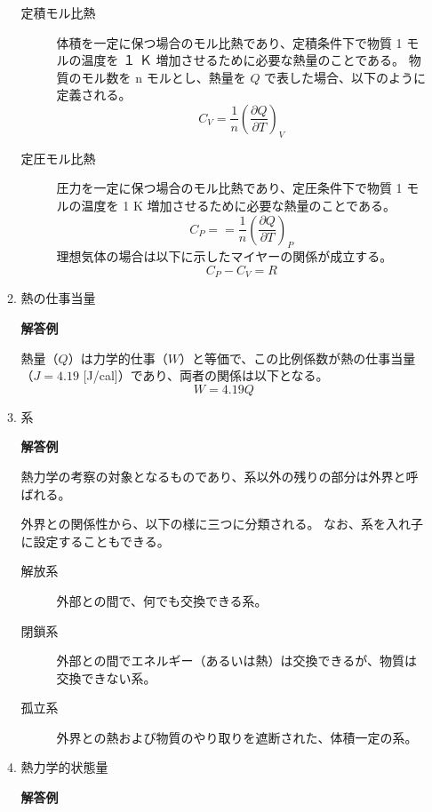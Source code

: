 \documentclass[uplatex,dvipdfmx,a4paper,11pt]{jsarticle}
\begin{document}
\begin{appendix}
\begin{enumerate}
\begin{enumerate}
\begin{description}
\item[定積モル比熱]
体積を一定に保つ場合のモル比熱であり、定積条件下で物質 1 モルの温度を １ Ｋ 増加させるために必要な熱量のことである。
物質のモル数を n モルとし、熱量を $Q$ で表した場合、以下のように定義される。
\begin{equation*}
C_V = \dfrac{1}{n} \left( \dfrac{\partial Q}{\partial T} \right)_V
\end{equation*}

\item[定圧モル比熱]
圧力を一定に保つ場合のモル比熱であり、定圧条件下で物質 1 モルの温度を 1 K 増加させるために必要な熱量のことである。
\begin{equation*}
C_P = = \dfrac{1}{n} \left( \dfrac{\partial Q}{\partial T} \right)_P
\end{equation*}
理想気体の場合は以下に示したマイヤーの関係が成立する。
\begin{equation*}
C_P-C_V = R
\end{equation*}

\end{description}


\item
熱の仕事当量

{\bf 解答例}

熱量（$Q$）は力学的仕事（$W$）と等価で、この比例係数が熱の仕事当量（$J=4.19$ [J/cal]）であり、両者の関係は以下となる。
\begin{equation*}
W=4.19 Q
\end{equation*}

\item
系

{\bf 解答例}

熱力学の考察の対象となるものであり、系以外の残りの部分は外界と呼ばれる。

外界との関係性から、以下の様に三つに分類される。
なお、系を入れ子に設定することもできる。

\begin{description}
\item[解放系]
外部との間で、何でも交換できる系。
\item[閉鎖系]
外部との間でエネルギー（あるいは熱）は交換できるが、物質は交換できない系。
\item[孤立系]
外界との熱および物質のやり取りを遮断された、体積一定の系。
\end{description}

\item
熱力学的状態量

{\bf 解答例}


\end{enumerate}
\end{enumerate}
\end{appendix}
\end{document}
